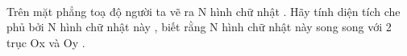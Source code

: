  

Trên mặt phẳng toạ độ người ta vẽ ra N hình chữ nhật . Hãy tính diện tích che phủ bởi N hình chữ nhật này , biết rằng N hình chữ nhật này song song với 2 trục Ox và Oy .
